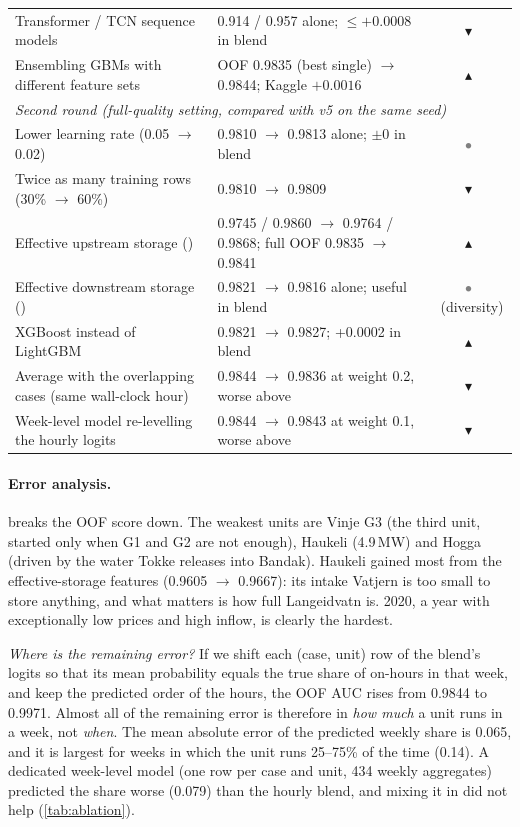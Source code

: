 \documentclass[11pt,a4paper]{article}
\newcommand{\code}[1]{\texttt{\detokenize{#1}}}
\newcommand{\pos}{\textcolor{green!45!black}{$\blacktriangle$}}
\newcommand{\negv}{\textcolor{red!70!black}{$\blacktriangledown$}}
\newcommand{\neu}{\textcolor{gray}{$\bullet$}}
\begin{document}
\begin{table}[ht]
\begin{tabular}{p{6.6cm}p{5.9cm}c}
Transformer / TCN sequence models & 0.914 / 0.957 alone; $\le+0.0008$ in blend & \negv\\
Ensembling GBMs with different feature sets & OOF 0.9835 (best single) $\to$ 0.9844; Kaggle $+0.0016$ & \pos\\
\midrule
\multicolumn{3}{l}{\emph{Second round (full-quality setting, compared with v5 on the same seed)}}\\
Lower learning rate (0.05 $\to$ 0.02) & 0.9810 $\to$ 0.9813 alone; $\pm0$ in blend & \neu\\
Twice as many training rows (30\% $\to$ 60\%) & 0.9810 $\to$ 0.9809 & \negv\\
Effective upstream storage (\code{--topo2}) & 0.9745 / 0.9860 $\to$ 0.9764 / 0.9868; full OOF 0.9835 $\to$ 0.9841 & \pos\\
Effective downstream storage (\code{--dn2}) & 0.9821 $\to$ 0.9816 alone; useful in blend & \neu\ (diversity)\\
XGBoost instead of LightGBM & 0.9821 $\to$ 0.9827; +0.0002 in blend & \pos\\
Average with the overlapping cases (same wall-clock hour) & 0.9844 $\to$ 0.9836 at weight 0.2, worse above & \negv\\
Week-level model re-levelling the hourly logits & 0.9844 $\to$ 0.9843 at weight 0.1, worse above & \negv\\
\bottomrule
\end{tabular}
\end{table}

\paragraph{Error analysis.}  breaks the OOF score down. The weakest units are Vinje G3
(the third unit, started only when G1 and G2 are not enough), Haukeli (4.9\,MW) and Hogga (driven by the water
Tokke releases into Bandak). Haukeli gained most from the effective-storage features (0.9605 $\to$ 0.9667):
its intake Vatjern is too small to store anything, and what matters is how full Langeidvatn is. 2020, a year
with exceptionally low prices and high inflow, is clearly the hardest.

\emph{Where is the remaining error?} If we shift each (case, unit) row of the blend's logits so that its mean
probability equals the true share of on-hours in that week, and keep the predicted order of the hours, the
OOF AUC rises from 0.9844 to 0.9971. Almost all of the remaining error is therefore in \emph{how much} a unit
runs in a week, not \emph{when}. The mean absolute error of the predicted weekly share is 0.065, and it is
largest for weeks in which the unit runs 25--75\% of the time (0.14). A dedicated week-level model
(one row per case and unit, 434 weekly aggregates) predicted the share worse (0.079) than the hourly blend,
and mixing it in did not help (\cref{tab:ablation}).
\end{document}

